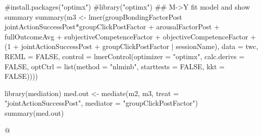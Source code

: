 #install.packages("optimx")
#library("optimx")
## M->Y fit model and show summary
summary(m3 <- lmer(groupBondingFactorPost ~ jointActionSuccessPost*groupClickPostFactor +
                                            arousalFactorPost + fullOutcomeAvg +
                                            subjectiveCompetenceFactor + objectiveCompetenceFactor + (1 + jointActionSuccessPost + groupClickPostFactor | sessionName),
                                            data = twc, REML = FALSE, control = lmerControl(optimizer = "optimx", calc.derivs = FALSE, optCtrl = list(method = "nlminb", starttests = FALSE, kkt = FALSE))))

library(mediation)
med.out <- mediate(m2, m3, treat = "jointActionSuccessPost", mediator = "groupClickPostFactor")
summary(med.out)


@
